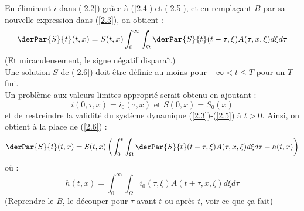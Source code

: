 \documentclass{article}
\begin{document}
En éliminant $i$ dans (\ref{2.2}) grâce à (\ref{2.4}) et (\ref{2.5}), et en remplaçant $B$ par sa nouvelle expression dans (\ref{2.3}), on obtient :
	\begin{equation} \label{2.6} \derPar{S}{t}(t,x)=S(t,x)\int_0^\infty\int_\Omega \derPar{S}{t}(t-\tau,\xi)A(\tau,x,\xi)d\xi d\tau \end{equation}
(Et miraculeusement, le signe négatif disparaît)\\
Une solution $S$ de (\ref{2.6}) doit être définie au moins pour $-\infty<t\leq T$ pour un $T$ fini.\\
Un problème aux valeurs limites approprié serait obtenu en ajoutant :
	\[i(0,\tau,x)=i_0(\tau,x) \text{ et } S(0,x)=S_0(x)\]
et de restreindre la validité du système dynamique (\ref{2.3})-(\ref{2.5}) à $t>0$. Ainsi, on obtient à la place de (\ref{2.6}) :
	\begin{equation} \label{2.7} \derPar{S}{t}(t,x)=S(t,x)\left(\int_0^t \int_\Omega \derPar{S}{t}(t-\tau,\xi)A(\tau,x,\xi)d\xi d\tau -h(t,x)\right)\end{equation}
où :
	\begin{equation} \label{2.8} h(t,x)=\int_0^\infty \int_\Omega i_0(\tau,\xi)A(t+\tau,x,\xi)d\xi d\tau \end{equation}
(Reprendre le $B$, le découper pour $\tau$ avant $t$ ou après $t$, voir ce que ça fait)
\end{document}
